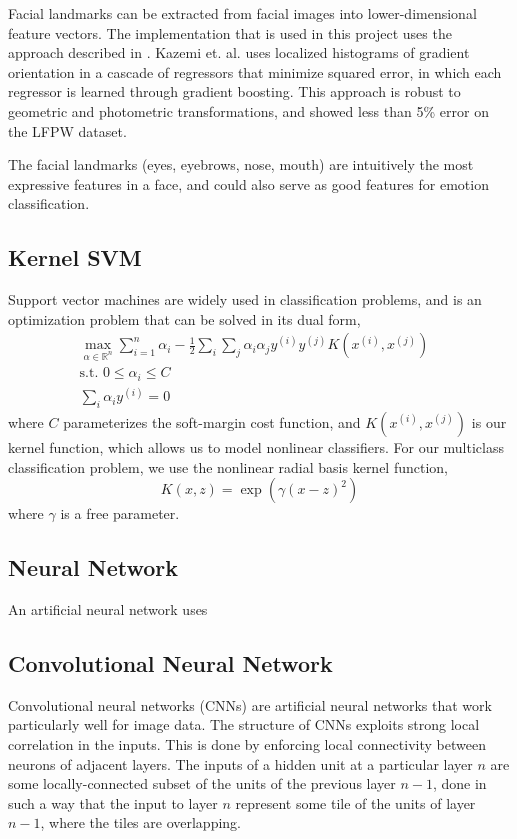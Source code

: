\documentclass[11pt, twocolumn, twoside]{article}
\begin{document}
Facial landmarks can be extracted from facial images into lower-dimensional feature
vectors. The implementation that is used in this project uses the approach described
in \cite{Kazemi}. Kazemi et. al. uses localized histograms of gradient orientation in
a cascade of regressors that minimize squared error, in which each regressor is learned
through gradient boosting. This approach is robust to geometric and photometric
transformations, and showed less than 5\% error on the LFPW dataset.

The facial landmarks (eyes, eyebrows, nose, mouth) are intuitively the most expressive 
features in a face, and could also serve as good features for emotion classification.

\subsection{Kernel SVM}

Support vector machines are widely used in classification problems, and is an
optimization problem that can be solved in its dual form,
\begin{align}
\label{softsvm}
\max_{\alpha \in \mathbb{R}^n} \sum_{i=1}^n \alpha_i - \frac{1}{2}\sum_i\sum_j
\alpha_i\alpha_j y^{(i)}y^{(j)}K(x^{(i)}, x^{(j)}) & \\
\text{s.t. } 0 \le \alpha_i \le C & \\
\sum_i \alpha_i y^{(i)} = 0 &
\end{align}
where $C$ parameterizes the soft-margin cost function, and $K(x^{(i)}, x^{(j)})$
is our kernel function, which allows us to model nonlinear classifiers.
For our multiclass classification problem, we use the nonlinear radial basis
kernel function,
\begin{equation}
K(x, z) = \exp{(\gamma(x - z)^2)}
\end{equation}
where $\gamma$ is a free parameter.

\subsection{Neural Network}

An artificial neural network uses

\subsection{Convolutional Neural Network}

Convolutional neural networks (CNNs) are artificial neural networks that work particularly well for image data. The structure of CNNs exploits strong local correlation in the inputs. This is done by enforcing local connectivity between neurons of adjacent layers. The inputs of a hidden unit at a particular layer $n$ are some locally-connected subset of the units of the previous layer $n-1$, done in such a way that the input to layer $n$ represent some tile of the units of layer $n-1$, where the tiles are overlapping.
\end{document}

